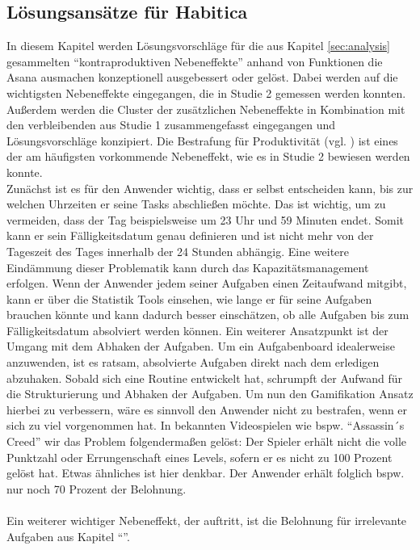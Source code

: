 \documentclass[sigconf, nonacm]{acmart}
\begin{document}
\subsection{Lösungsansätze für Habitica}\label{sec:solutions_for_habitica}
In diesem Kapitel werden Lösungsvorschläge für die aus Kapitel \ref{sec:analysis} gesammelten \enquote{kontraproduktiven Nebeneffekte} anhand von Funktionen die Asana ausmachen konzeptionell ausgebessert oder gelöst.
Dabei werden auf die wichtigsten Nebeneffekte eingegangen, die in Studie 2 gemessen werden konnten. Außerdem werden die Cluster der zusätzlichen Nebeneffekte in Kombination mit den verbleibenden aus Studie 1 zusammengefasst eingegangen und Lösungsvorschläge konzipiert.
Die Bestrafung für Produktivität (vgl. ) ist eines der am häufigsten vorkommende Nebeneffekt, wie es in Studie 2 bewiesen werden konnte. \\
Zunächst ist es für den Anwender wichtig, dass er selbst entscheiden kann, bis zur welchen Uhrzeiten er seine Tasks abschließen möchte. Das ist wichtig, um zu vermeiden, dass der Tag beispielsweise um 23 Uhr und 59 Minuten endet. Somit kann er sein Fälligkeitsdatum genau definieren und ist nicht mehr von der Tageszeit des Tages innerhalb der 24 Stunden abhängig. Eine weitere Eindämmung dieser Problematik kann durch das Kapazitätsmanagement erfolgen. Wenn der Anwender jedem seiner Aufgaben einen Zeitaufwand mitgibt, kann er über die Statistik Tools einsehen, wie lange er für seine Aufgaben brauchen könnte und kann dadurch besser einschätzen, ob alle Aufgaben bis zum Fälligkeitsdatum absolviert werden können. Ein weiterer Ansatzpunkt ist der Umgang mit dem Abhaken der Aufgaben. Um ein Aufgabenboard idealerweise anzuwenden, ist es ratsam, absolvierte Aufgaben direkt nach dem erledigen abzuhaken. Sobald sich eine Routine entwickelt hat, schrumpft der Aufwand für die Strukturierung und Abhaken der Aufgaben.
Um nun den Gamifikation Ansatz hierbei zu verbessern, wäre es sinnvoll den Anwender nicht zu bestrafen, wenn er sich zu viel vorgenommen hat. In bekannten Videospielen wie bspw. \enquote{Assassin´s Creed} wir das Problem folgendermaßen gelöst: Der Spieler erhält nicht die volle Punktzahl oder Errungenschaft eines Levels, sofern er es nicht zu 100 Prozent gelöst hat. Etwas ähnliches ist hier denkbar. Der Anwender erhält folglich bspw. nur noch 70 Prozent der Belohnung.~\cite{noauthor_assassins_nodate}
\\
\\
Ein weiterer wichtiger Nebeneffekt, der auftritt, ist die Belohnung für irrelevante Aufgaben aus Kapitel \enquote{}. 
\end{document}
